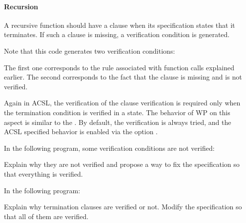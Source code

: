 \paragraph{Recursion}


A recursive function should have a  clause when its
specification states that it terminates. If such a clause is missing, a
verification condition  is generated.




Note that this code generates two verification conditions:




The first one corresponds to the rule associated with function calls explained
earlier. The second corresponds to the fact that the 
clause is missing and is not verified.


Again in ACSL, the verification of the  clause
verification is required only when the termination condition is verified in
a  state. The behavior of WP on this aspect is similar to the
. By default, the verification is always tried, and the
ACSL specified behavior is enabled via the option
.








In the following program, some verification conditions are not verified:




Explain why they are not verified and propose a way to fix the specification so
that everything is verified.






In the following program:




Explain why termination clauses are verified or not. Modify the specification so
that all of them are verified.






